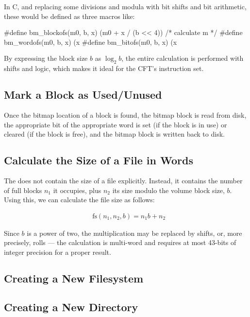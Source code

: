 \noindent In C, and replacing some divisions and modula with bit shifts and bit
arithmetic, these would be defined as three macros like:

\begin{ccode}
#define bm_blockofs(m0, b, x) (m0 + x / (b << 4))  /* calculate m */
#define bm_wordofs(m0, b, x)  (x %
#define bm_bitofs(m0, b, x)   (x %
\end{ccode}

\noindent By expressing the block size $b$ as $\log_2{b}$, the entire calculation is
performed with shifts and logic, which makes it ideal for the CFT's instruction
set.

\subsection{Mark a Block as Used/Unused}

Once the bitmap location of a block is found, the bitmap block is read from
disk, the appropriate bit of the appropriate word is set (if the block is in
use) or cleared (if the block is free), and the bitmap block is written back to
disk.

\subsection{Calculate the Size of a File in Words}

The  does not contain the size of a file
explicitly. Instead, it contains the number of full blocks $n_1$ it
occupies, plus $n_2$ its size modulo the volume block size, $b$. Using this,
we can calculate the file size as follows:

\begin{eqnarray}
& \mbox{fs}(n_1, n_2, b) = n_1b + n_2\nonumber
\end{eqnarray}

Since $b$ is a power of two, the multiplication may be replaced by
shifts, or, more precisely, rolls — the calculation is multi-word and
requires at most 43-bits of integer precision for a proper result.

\subsection{Creating a New Filesystem}


\subsection{Creating a New Directory}

